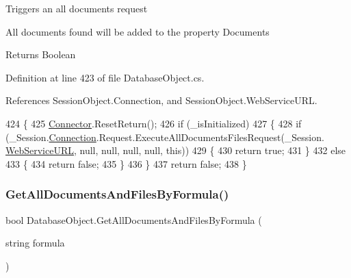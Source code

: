 Triggers an all documents request

All documents found will be added to the property \textquotesingle{}Documents\textquotesingle{}

\begin{DoxyReturn}{Returns}
Boolean
\end{DoxyReturn}


Definition at line 423 of file Database\+Object.\+cs.



References Session\+Object.\+Connection, and Session\+Object.\+Web\+Service\+U\+RL.


\begin{DoxyCode}
424     \{
425         \mbox{\hyperlink{class_connector}{Connector}}.ResetReturn();
426         \textcolor{keywordflow}{if} (\_isInitialized)
427         \{
428             \textcolor{keywordflow}{if} (\_Session.\mbox{\hyperlink{class_session_object_a014bdbf705a753540e19bfb53030c55c}{Connection}}.Request.ExecuteAllDocumentsFilesRequest(\_Session.
      \mbox{\hyperlink{class_session_object_a697c071c812fbf7ad1166b896fb44c16}{WebServiceURL}}, null, null, null, null, \textcolor{keyword}{this}))
429             \{
430                 \textcolor{keywordflow}{return} \textcolor{keyword}{true};
431             \}
432             \textcolor{keywordflow}{else}
433             \{
434                 \textcolor{keywordflow}{return} \textcolor{keyword}{false};
435             \}
436         \}
437         \textcolor{keywordflow}{return} \textcolor{keyword}{false};
438     \}
\end{DoxyCode}
\mbox{\label{class_database_object_ac478ff9264805edc8569d510916c4c00}} 
\subsubsection{\texorpdfstring{Get\+All\+Documents\+And\+Files\+By\+Formula()}{GetAllDocumentsAndFilesByFormula()}}
{\footnotesize\ttfamily bool Database\+Object.\+Get\+All\+Documents\+And\+Files\+By\+Formula (\begin{DoxyParamCaption}\item[{string}]{formula }\end{DoxyParamCaption})}



